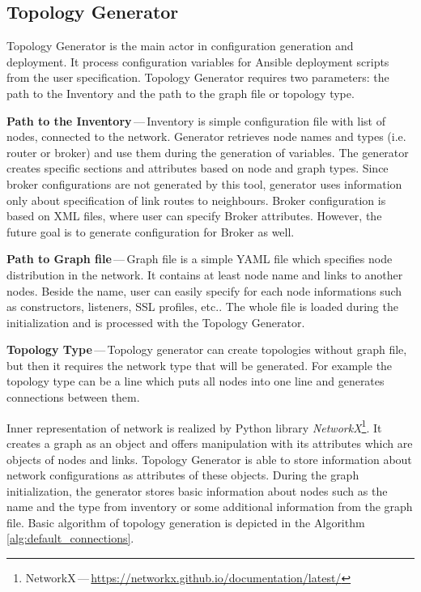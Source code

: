 \subsection{Topology Generator}
Topology Generator is the main actor in configuration generation and deployment. It process configuration variables for Ansible deployment scripts from the user specification. Topology Generator requires two parameters: the path to the Inventory and the path to the graph file or topology type.

\begin{description}
	\item \textbf{Path to the Inventory}\,---\,Inventory is simple configuration file with list of nodes, connected to the network. Generator retrieves node names and types (i.e. router or broker) and use them during the generation of variables. The generator creates specific sections and attributes based on node and graph types. Since broker configurations are not generated by this tool, generator uses information only about specification of link routes to neighbours. Broker configuration is based on XML files, where user can specify Broker attributes. However, the future goal is to generate configuration for Broker as well.
	\item \textbf{Path to Graph file}\,---\,Graph file is a simple YAML file which specifies node distribution in the network. It contains at least node name and links to another nodes. Beside the name, user can easily specify for each node informations such as constructors, listeners, SSL profiles, etc.. The whole file is loaded during the initialization and is processed with the Topology Generator.
	\item \textbf{Topology Type}\,---\,Topology generator can create topologies without graph file, but then it requires the network type that will be generated. For example the topology type can be a line which puts all nodes into one line and generates connections between them.
\end{description}

Inner representation of network is realized by Python library \emph{NetworkX}\footnote{NetworkX\,---\,\url{https://networkx.github.io/documentation/latest/}}. It creates a graph as an object and offers manipulation with its attributes which are objects of nodes and links. Topology Generator is able to store information about network configurations as attributes of these objects. During the graph initialization, the generator stores basic information about nodes such as the name and the type from inventory or some additional information from the graph file. Basic algorithm of topology generation is depicted in the Algorithm \ref{alg:default_connections}.

